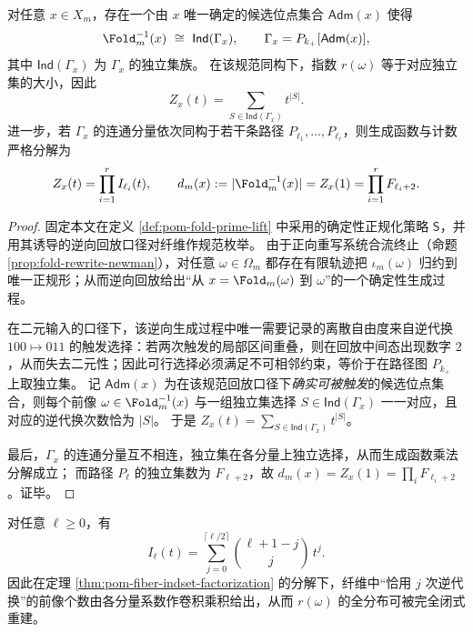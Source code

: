 \begin{theorem}\label{thm:pom-fiber-indset-factorization}
对任意 \(x\in X_m\)，存在一个由 \(x\) 唯一确定的候选位点集合 \(\mathsf{Adm}(x)\) 使得
\[
\Fold_m^{-1}(x)\ \cong\ \mathsf{Ind}(\Gamma_x),
\qquad
\Gamma_x=P_{k_{+}}[\mathsf{Adm}(x)],
\]
其中 \(\mathsf{Ind}(\Gamma_x)\) 为 \(\Gamma_x\) 的独立集族。
在该规范同构下，指数 \(r(\omega)\) 等于对应独立集的大小，因此
\[
Z_x(t)=\sum_{S\in\mathsf{Ind}(\Gamma_x)} t^{|S|}.
\]
进一步，若 \(\Gamma_x\) 的连通分量依次同构于若干条路径 \(P_{\ell_1},\dots,P_{\ell_r}\)，则生成函数与计数严格分解为
\[
Z_x(t)=\prod_{i=1}^r I_{\ell_i}(t),
\qquad
d_m(x):=|\Fold_m^{-1}(x)|=Z_x(1)=\prod_{i=1}^r F_{\ell_i+2}.
\]
\end{theorem}

\begin{proof}
固定本文在定义 \ref{def:pom-fold-prime-lift} 中采用的确定性正规化策略 \(\mathsf S\)，并用其诱导的逆向回放口径对纤维作规范枚举。
由于正向重写系统合流终止（命题 \ref{prop:fold-rewrite-newman}），对任意 \(\omega\in\Omega_m\) 都存在有限轨迹把 \(\iota_m(\omega)\) 归约到唯一正规形；从而逆向回放给出“从 \(x=\Fold_m(\omega)\) 到 \(\omega\)”的一个确定性生成过程。
\par
在二元输入的口径下，该逆向生成过程中唯一需要记录的离散自由度来自逆代换 \(100\mapsto 011\) 的触发选择：若两次触发的局部区间重叠，则在回放中间态出现数字 \(2\)，从而失去二元性；因此可行选择必须满足不可相邻约束，等价于在路径图 \(P_{k_{+}}\) 上取独立集。
记 \(\mathsf{Adm}(x)\) 为在该规范回放口径下\emph{确实可被触发}的候选位点集合，则每个前像 \(\omega\in\Fold_m^{-1}(x)\) 与一组独立集选择 \(S\in\mathsf{Ind}(\Gamma_x)\) 一一对应，且对应的逆代换次数恰为 \(|S|\)。
于是 \(Z_x(t)=\sum_{S\in\mathsf{Ind}(\Gamma_x)}t^{|S|}\)。
\par
最后，\(\Gamma_x\) 的连通分量互不相连，独立集在各分量上独立选择，从而生成函数乘法分解成立；
而路径 \(P_\ell\) 的独立集数为 \(F_{\ell+2}\)，故 \(d_m(x)=Z_x(1)=\prod_i F_{\ell_i+2}\)。证毕。
\end{proof}

\begin{theorem}[路径独立集多项式的闭式系数]\label{thm:pom-path-indset-poly-closed}
对任意 \(\ell\ge 0\)，有
\[
I_{\ell}(t)=\sum_{j=0}^{\lceil \ell/2\rceil}\binom{\ell+1-j}{j}\,t^j.
\]
因此在定理 \ref{thm:pom-fiber-indset-factorization} 的分解下，纤维中“恰用 \(j\) 次逆代换”的前像个数由各分量系数作卷积乘积给出，从而 \(r(\omega)\) 的全分布可被完全闭式重建。
\end{theorem}

